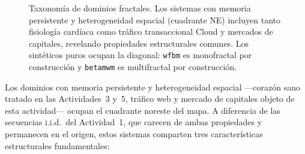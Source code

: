 \begin{figure}[H]
\caption{Taxonomía de dominios fractales. Los sistemas con memoria persistente
         y heterogeneidad espacial (cuadrante NE) incluyen tanto fisiología
         cardíaca como tráfico transaccional Cloud y mercados de capitales,
         revelando propiedades estructurales comunes. Los sintéticos puros ocupan la diagonal:
         \texttt{wfbm} es monofractal por construcción y \texttt{betamwm} es
         multifractal por construcción.}
\label{fig:taxonomia}
\end{figure}

Los dominios con memoria persistente y heterogeneidad espacial ---corazón sano
tratado en las Actividades~3 y~5, tráfico web y mercado de capitales objeto de esta actividad---
ocupan el cuadrante noreste del mapa. A diferencia de las secuencias i.i.d.\ del
Actividad~1, que carecen de ambas propiedades y permanecen en el origen, estos
sistemas comparten tres características estructurales fundamentales:

